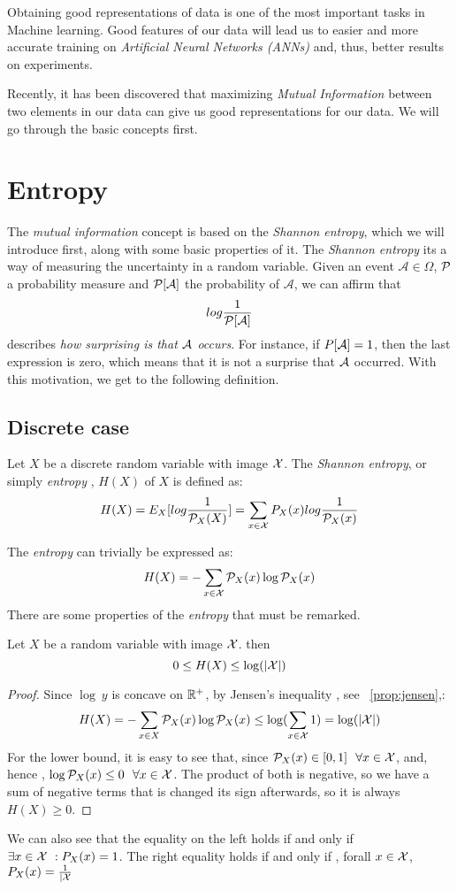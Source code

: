 Obtaining good representations of data is one of the most important tasks in Machine learning. Good features of our data will lead us to easier and more accurate training on \emph{Artificial Neural Networks (ANNs)} and, thus, better results on experiments.

Recently, it has been discovered that maximizing \emph{Mutual Information} between two elements in our data can give us good representations for our data. We will go through the basic concepts first.


\section{Entropy}

The \emph{mutual information} concept is based on the \emph{Shannon entropy}, which we will introduce first, along with some basic properties of it. The \emph{Shannon entropy} its a way of measuring the uncertainty in a random variable. Given an event $\mathcal A \in \Omega$, $\mathcal{P}$ a probability measure and $\mathcal{P}[\mathcal A]$ the probability of $\mathcal A$, we can affirm that 
$$
log\frac{1}{\mathcal{P}[\mathcal A]}
$$
describes \emph{how surprising is that $\mathcal A$ occurs}. For instance, if $P[\mathcal A] = 1$, then the last expression is zero, which means that it is not a surprise that $\mathcal A$ occurred. With this motivation, we get to the following definition.

\subsection{Discrete case}

\begin{ndef}
Let $X$ be a discrete random variable with image $\mathcal{X}$. The \emph{Shannon entropy}, or simply \emph{entropy} , $H(X)$ of $X$ is defined as:
$$
H(X) = E_X[log\frac{1}{\mathcal{P}_X(X)}] =  \sum_{x \in \mathcal{X}} P_X(x) log\frac{1}{\mathcal{P}_X(x)}
$$
\end{ndef}
The \emph{entropy} can trivially be expressed as:
$$
H(X) = - \sum_{x \in \mathcal{X}}\mathcal{P}_X (x)\log \mathcal{P}_X(x)
$$
There are some properties of the \emph{entropy} that must be remarked. 
\begin{nprop}
    Let $X$ be a random variable with image $\mathcal{X}$. then
    $$
0 \leq H(X) \leq \log(|\mathcal{X}|)
    $$
\end{nprop}
\begin{proof}
    Since $\log \ y$ is concave on $\mathbb{R}^+$, by Jensen's inequality , see ~\ref{prop:jensen},:
    $$
    H(X) = - \sum_{x \in X}\mathcal{P}_X (x)\log \mathcal{P}_X(x) \leq \log(\sum_{x \in \mathcal{X}} 1) = \log(|\mathcal{X}|)
    $$
    For the lower bound, it is easy to see that, since $\mathcal{P}_X(x) \in [0,1] \ \  \forall x \in \mathcal{X} $, and, hence , $\log \mathcal{P}_X(x) \leq 0 \ \ \forall x \in \mathcal{X}$. The product of both is negative, so we have a sum of negative terms that is changed its sign afterwards, so it is always $H(X) \geq 0$. 
\end{proof}
We can also see that the equality on the left holds if and only if $\exists x \in \mathcal{X} \ : P_X(x) = 1$. The right equality holds if and only if , forall $x \in \mathcal{X}$, $P_X(x) = \frac{1}{|\mathcal{X}}$

